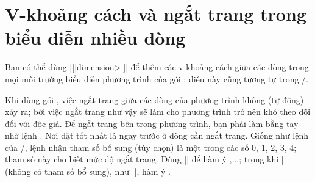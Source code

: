 \documentclass[11pt,leqno,titlepage,openany]{amsldoc}[1999/12/13]
\newcommand{\ii}[1]{#1\index{#1}}
\begin{document}
\section{V-khoảng cách và ngắt trang trong biểu diễn nhiều dòng}

Bạn có thể dùng \cn{\\}|[|\<dimension>|]| để thêm các v-khoảng cách giữa
các dòng trong mọi môi trường biểu diễn phương trình của gói ;
điều này cũng tương tự trong \latex/.


\medskip
Khi dùng gói , việc \ii{ngắt trang} giữa các dòng của phương trình
không (tự động) xảy ra; bởi việc ngắt trang như vậy sẽ làm cho phương trình trở nên
khó theo dõi đối với độc giả.
Để ngắt trang bên trong phương trình, bạn phải làm bằng tay nhờ lệnh
.
Nơi đặt  tốt nhất là ngay trước \cn{\\} ở dòng cần ngắt trang.
Giống như lệnh  của \latex/, lệnh  nhận
tham số bổ sung (tùy chọn) là một trong các số 0, 1, 2, 3, 4;
tham số này cho biết mức độ ngắt trang. Dùng |\displaybreak[0]| để hàm ý
,...; trong khi |\displaybreak|
(không có tham số bổ sung), như |\displaybreak[4]|, hàm ý
.
\end{document}
